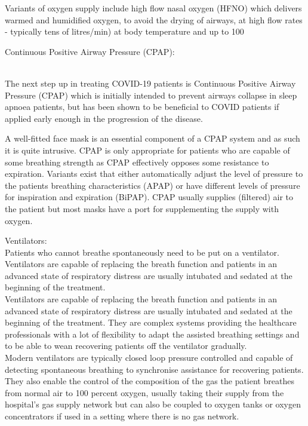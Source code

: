 \documentclass[12pt]{article}
\begin{document}
Variants of oxygen supply include high flow nasal oxygen (HFNO) which delivers warmed and humidified oxygen, to avoid the drying of airways, at high flow rates - typically tens of litres/min) at body temperature and up to 100%

\newpage

{ \large Continuous Positive Airway Pressure (CPAP):}

\\
The next step up in treating COVID-19 patients is Continuous Positive Airway Pressure (CPAP) which is initially intended to prevent airways collapse in sleep apnoea patients, but has been shown to be beneficial to COVID patients if applied early enough in the progression of the disease.

A well-fitted face mask is an essential component of a CPAP system and as such it is quite intrusive. CPAP is only appropriate for patients who are capable of some breathing strength as CPAP effectively opposes some resistance to expiration. Variants exist that either automatically adjust the level of pressure to the patients breathing characteristics (APAP) or have different levels of pressure for inspiration and expiration (BiPAP). CPAP usually supplies (filtered) air to the patient but most masks have a port for supplementing the supply with oxygen.

\indent

{ \large Ventilators:}
\\
Patients who cannot breathe spontaneously need to be put on a ventilator. Ventilators are capable of replacing the breath function and patients in an advanced state of respiratory distress are usually intubated and sedated at the beginning of the treatment.
\\
Ventilators are capable of replacing the breath function and patients in an advanced state of respiratory distress are usually intubated and sedated at the beginning of the treatment. They are complex systems providing the healthcare professionals with a lot of flexibility to adapt the assisted breathing settings and to be able to wean recovering patients off the ventilator gradually.
\\
Modern ventilators are typically closed loop pressure controlled and capable of detecting spontaneous breathing to synchronise assistance for recovering patients. They also enable the control of the composition of the gas the patient breathes from normal air to 100 percent oxygen, usually taking their supply from the hospital’s gas supply network but can also be coupled to oxygen tanks or oxygen concentrators if used in a setting where there is no gas network.
\end{document}
